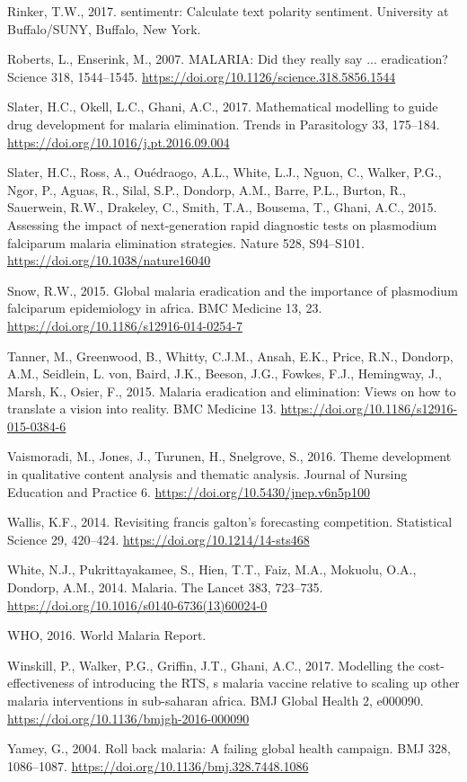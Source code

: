 \documentclass[]{article}
\begin{document}
\hypertarget{ref-sentimentr2017}{}
Rinker, T.W., 2017. sentimentr: Calculate text polarity sentiment.
University at Buffalo/SUNY, Buffalo, New York.

\hypertarget{ref-Roberts2007}{}
Roberts, L., Enserink, M., 2007. MALARIA: Did they really say ...
eradication? Science 318, 1544--1545.
\url{https://doi.org/10.1126/science.318.5856.1544}

\hypertarget{ref-Slater2017}{}
Slater, H.C., Okell, L.C., Ghani, A.C., 2017. Mathematical modelling to
guide drug development for malaria elimination. Trends in Parasitology
33, 175--184. \url{https://doi.org/10.1016/j.pt.2016.09.004}

\hypertarget{ref-Slater2015}{}
Slater, H.C., Ross, A., Ouédraogo, A.L., White, L.J., Nguon, C., Walker,
P.G., Ngor, P., Aguas, R., Silal, S.P., Dondorp, A.M., Barre, P.L.,
Burton, R., Sauerwein, R.W., Drakeley, C., Smith, T.A., Bousema, T.,
Ghani, A.C., 2015. Assessing the impact of next-generation rapid
diagnostic tests on plasmodium falciparum malaria elimination
strategies. Nature 528, S94--S101.
\url{https://doi.org/10.1038/nature16040}

\hypertarget{ref-Snow2015}{}
Snow, R.W., 2015. Global malaria eradication and the importance of
plasmodium falciparum epidemiology in africa. BMC Medicine 13, 23.
\url{https://doi.org/10.1186/s12916-014-0254-7}

\hypertarget{ref-Tanner2015}{}
Tanner, M., Greenwood, B., Whitty, C.J.M., Ansah, E.K., Price, R.N.,
Dondorp, A.M., Seidlein, L. von, Baird, J.K., Beeson, J.G., Fowkes,
F.J., Hemingway, J., Marsh, K., Osier, F., 2015. Malaria eradication and
elimination: Views on how to translate a vision into reality. BMC
Medicine 13. \url{https://doi.org/10.1186/s12916-015-0384-6}

\hypertarget{ref-Vaismoradi_2016}{}
Vaismoradi, M., Jones, J., Turunen, H., Snelgrove, S., 2016. Theme
development in qualitative content analysis and thematic analysis.
Journal of Nursing Education and Practice 6.
\url{https://doi.org/10.5430/jnep.v6n5p100}

\hypertarget{ref-Wallis2014}{}
Wallis, K.F., 2014. Revisiting francis galton's forecasting competition.
Statistical Science 29, 420--424.
\url{https://doi.org/10.1214/14-sts468}

\hypertarget{ref-White2014}{}
White, N.J., Pukrittayakamee, S., Hien, T.T., Faiz, M.A., Mokuolu, O.A.,
Dondorp, A.M., 2014. Malaria. The Lancet 383, 723--735.
\url{https://doi.org/10.1016/s0140-6736(13)60024-0}

\hypertarget{ref-World2016}{}
WHO, 2016. World Malaria Report.

\hypertarget{ref-Winskill2017}{}
Winskill, P., Walker, P.G., Griffin, J.T., Ghani, A.C., 2017. Modelling
the cost-effectiveness of introducing the RTS, s malaria vaccine
relative to scaling up other malaria interventions in sub-saharan
africa. BMJ Global Health 2, e000090.
\url{https://doi.org/10.1136/bmjgh-2016-000090}

\hypertarget{ref-Yamey2004}{}
Yamey, G., 2004. Roll back malaria: A failing global health campaign.
BMJ 328, 1086--1087. \url{https://doi.org/10.1136/bmj.328.7448.1086}
\end{document}
